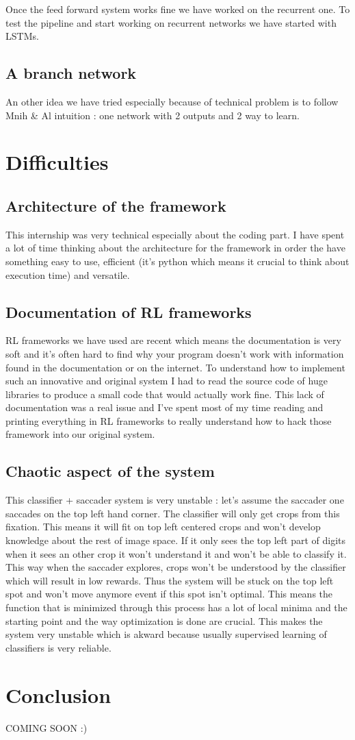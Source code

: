 \documentclass[11pt]{article}
\begin{document}
Once the feed forward system works fine we have worked on the recurrent one. To test the pipeline and start working on recurrent networks we have started with LSTMs.



\subsection{A branch network}
An other idea we have tried especially because of technical problem is to follow Mnih \& Al intuition : one network with 2 outputs and 2 way to learn. 


\section{Difficulties}
\subsection{Architecture of the framework}
This internship was very technical especially about the coding part. I have spent a lot of time thinking about the architecture for the framework in order the have something easy to use, efficient (it's python which means it crucial to think about execution time) and versatile.
\subsection{Documentation of RL frameworks}
RL frameworks we have used are recent which means the documentation is very soft and it's often hard to find why your program doesn't work with information found in the documentation or on the internet. To understand how to implement such an innovative and original system I had to read the source code of huge libraries to produce a small code that would actually work fine. This lack of documentation was a real issue and I've spent most of my time reading and printing everything in RL frameworks to really understand how to hack those framework into our original system.
\subsection{Chaotic aspect of the system}
This classifier + saccader system is very unstable : let's assume the saccader one saccades on the top left hand corner. The classifier will only get crops from this fixation. This means it will fit on top left centered crops and won't develop knowledge about the rest of image space. If it only sees the top left part of digits when it sees an other crop it won't understand it and won't be able to classify it. This way when the saccader explores, crops won't be understood by the classifier which will result in low rewards. Thus the system will be stuck on the top left spot and won't move anymore event if this spot isn't optimal. This means the function that is minimized through this process has a lot of local minima and the starting point and the way optimization is done are crucial. This makes the system very unstable which is akward because usually supervised learning of classifiers is very reliable.
\section{Conclusion}
COMING SOON :)
\end{document}
